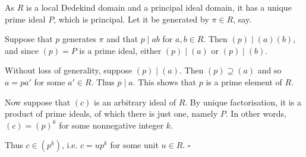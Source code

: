 \documentclass[10pt]{article}
\newcommand{\qed}{\square}
\newenvironment{proof}[1][Proof]{\begin{trivlist}
\item[\hskip \labelsep {\bfseries #1}]}{\end{trivlist}}
\begin{document}
\begin{proof}
As $R$ is a local Dedekind domain and a principal ideal domain, it has a unique prime ideal $P$, which is principal. Let it be generated by $\pi \in R$, say.

Suppose that $p$ generates $\pi$ and that $p \mid ab$ for $a, b \in R$. Then $(p) \mid (a)(b)$, and since $(p) = P$ is a prime ideal, either $(p) \mid (a)$ or $(p) \mid (b)$.

Without loss of generality, suppose $(p) \mid (a)$. Then $(p) \supseteq (a)$ and so $a = pa'$ for some $a' \in R$. Thus $p \mid a$. This shows that $p$ is a prime element of $R$.

Now suppose that $(c)$ is an arbitrary ideal of $R$. By unique factorisation, it is a product of prime ideals, of which there is just one, namely $P$. In other words, $(c) = (p)^k$ for some nonnegative integer $k$.

Thus $c \in (p^k)$, i.e. $c = up^k$ for some unit $u \in R$. $\qed$
\end{proof}
\end{document}
